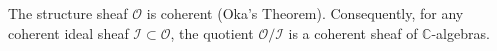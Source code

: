 The structure sheaf $\mathcal{O}$ is coherent (Oka's Theorem). Consequently, for any coherent ideal sheaf $\mathcal{I} \subset \mathcal{O}$, the quotient $\mathcal{O}/\mathcal{I}$ is a coherent sheaf of $\mathbb{C}$-algebras.
